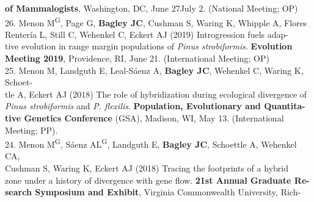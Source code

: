 \documentclass[margin,line]{res}
\begin{document}
\begin{resume}
\hspace*{8mm}\textbf{of Mammalogists}, Washington, DC, June 27\textendash July 2. (National Meeting; OP)\\ 
26. Menon M\textsuperscript{G}, Page G, \textbf{Bagley JC}, Cushman S, Waring K, Whipple A, Flores\textendash \\
\hspace*{8mm} Renter\'{i}a L, Still C, Wehenkel C, Eckert AJ (2019) Introgression fuels adap-\\
\hspace*{8mm} tive evolution in range margin populations of \emph{Pinus strobiformis}. \textbf{Evolution} \\ \vspace{2mm}
\hspace*{8mm}\textbf{Meeting 2019}, Providence, RI, June 21. (International Meeting; OP) \\
25. Menon M, Landguth E, Leal-S\'{a}enz A, \textbf{Bagley JC}, Wehenkel C, Waring K, Schoet-\\
\hspace*{8mm} tle A, Eckert AJ (2018) The role of hybridization during ecological divergence of \\
\hspace*{8mm} \textit{Pinus strobiformis} and \textit{P. flexilis}. \textbf{Population, Evolutionary and Quantita-}\\
\hspace*{8mm} \textbf{tive Genetics Conference} (GSA), Madison, WI, May 13. (International\\ \vspace{2mm}
\hspace*{8mm}Meeting; PP). \\
24. Menon M\textsuperscript{G}, S\'{a}enz AL\textsuperscript{G}, Landguth E, \textbf{Bagley JC}, Schoettle A, Wehenkel CA,\\
\hspace*{8mm} Cushman S, Waring K, Eckert AJ (2018) Tracing the footprints of a hybrid\\
\hspace*{8mm} zone under a history of divergence with gene flow. \textbf{21st Annual Graduate Re-}\\
\hspace*{8mm} \textbf{search Symposium and Exhibit}, Virginia Commonwealth University, Rich-\\ \vspace{2mm}

\end{resume}
\end{document}

